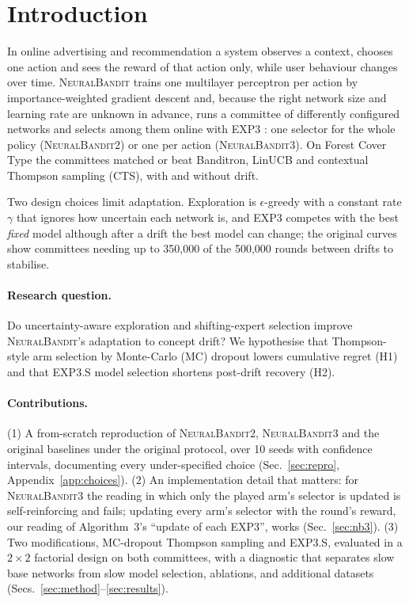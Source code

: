 \documentclass[sigconf]{acmart}
\newcommand{\NB}{\textsc{NeuralBandit}}
\begin{document}
\maketitle

\section{Introduction}
In online advertising and recommendation a system observes a context, chooses one action and sees the reward of that
action only, while user behaviour changes over time. \NB{} \cite{allesiardo2014neuralbandit} trains one multilayer
perceptron per action by importance-weighted gradient descent and, because the right network size and learning rate
are unknown in advance, runs a committee of differently configured networks and selects among them online with EXP3
\cite{auer2002nonstochastic}: one selector for the whole policy (\NB{}2) or one per action (\NB{}3). On Forest Cover
Type the committees matched or beat Banditron, LinUCB and contextual Thompson sampling (CTS), with and without drift.

Two design choices limit adaptation. Exploration is $\epsilon$-greedy with a constant rate $\gamma$ that ignores how
uncertain each network is, and EXP3 competes with the best \emph{fixed} model although after a drift the best model
can change; the original curves show committees needing up to 350{,}000 of the 500{,}000 rounds between drifts to
stabilise.

\paragraph{Research question.} Do uncertainty-aware exploration and shifting-expert selection improve \NB{}'s
adaptation to concept drift? We hypothesise that Thompson-style arm selection by Monte-Carlo (MC) dropout lowers
cumulative regret (H1) and that EXP3.S model selection shortens post-drift recovery (H2).

\paragraph{Contributions.}
(1) A from-scratch reproduction of \NB{}2, \NB{}3 and the original baselines under the original protocol, over 10 seeds
with confidence intervals, documenting every under-specified choice (Sec.~\ref{sec:repro}, Appendix~\ref{app:choices}).
(2) An implementation detail that matters: for \NB{}3 the reading in which only the played arm's selector is updated is
self-reinforcing and fails; updating every arm's selector with the round's reward, our reading of Algorithm~3's ``update of each EXP3'', works
(Sec.~\ref{sec:nb3}).
(3) Two modifications, MC-dropout Thompson sampling and EXP3.S, evaluated in a $2\times2$ factorial design on both
committees, with a diagnostic that separates slow base networks from slow model selection, ablations, and additional
datasets (Secs.~\ref{sec:method}--\ref{sec:results}).
\end{document}
